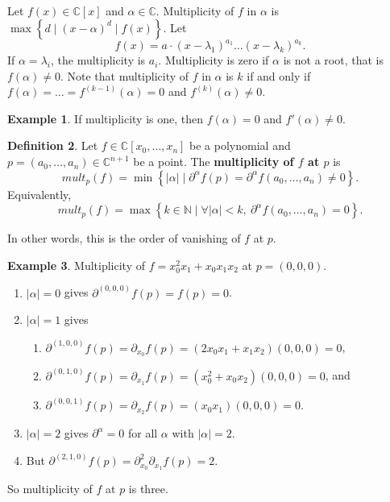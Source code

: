 \documentclass{article}
\newcommand{\N}{\mathbb{N}}
\newcommand{\C}{\mathbb{C}}
\newcommand{\rb}[1]{\left( #1 \right)}
\renewcommand{\sb}[1]{\left[ #1 \right]}
\newcommand{\cb}[1]{\left\{ #1 \right\}}
\newcommand{\abs}[1]{\left\lvert #1 \right\rvert}
\theoremstyle{definition}\newtheorem{definition}{Definition}[section]
\theoremstyle{definition}\newtheorem{notation}[definition]{Notation}
\theoremstyle{definition}\newtheorem{remark}[definition]{Remark}
\theoremstyle{definition}\newtheorem{example}[definition]{Example}
\theoremstyle{definition}\newtheorem{fact}{Fact}
\theoremstyle{definition}\newtheorem{exercise}{Exercise}
\begin{document}
Let $ f\rb{x} \in \C\sb{x} $ and $ \alpha \in \C $. Multiplicity of $ f $ in $ \alpha $ is $ \max\cb{d \mid \rb{x - \alpha}^d \mid f\rb{x}} $. Let
$$ f\rb{x} = a \cdot \rb{x - \lambda_1}^{a_1} \dots \rb{x - \lambda_k}^{a_k}. $$
If $ \alpha = \lambda_i $, the multiplicity is $ a_i $. Multiplicity is zero if $ \alpha $ is not a root, that is $ f\rb{\alpha} \ne 0 $. Note that multiplicity of $ f $ in $ \alpha $ is $ k $ if and only if $ f\rb{\alpha} = \dots = f^{\rb{k - 1}}\rb{\alpha} = 0 $ and $ f^{\rb{k}}\rb{\alpha} \ne 0 $.

\begin{example}
If multiplicity is one, then $ f\rb{\alpha} = 0 $ and $ f'\rb{\alpha} \ne 0 $.
\end{example}

\begin{definition}
Let $ f \in \C\sb{x_0, \dots, x_n} $ be a polynomial and $ p = \rb{a_0, \dots, a_n} \in \C^{n + 1} $ be a point. The \textbf{multiplicity of $ f $ at $ p $} is
$$ mult_p\rb{f} = \min\cb{\abs{\alpha} \mid \partial^\alpha f\rb{p} = \partial^\alpha f\rb{a_0, \dots, a_n} \ne 0}. $$
Equivalently,
$$ mult_p\rb{f} = \max\cb{k \in \N \mid \forall \abs{\alpha} < k, \ \partial^\alpha f\rb{a_0, \dots, a_n} = 0}. $$
\end{definition}


In other words, this is the order of vanishing of $ f $ at $ p $.

\begin{example}
Multiplicity of $ f = x_0^2x_1 + x_0x_1x_2 $ at $ p = \rb{0, 0, 0} $.
\begin{enumerate}
\item $ \abs{\alpha} = 0 $ gives $ \partial^{\rb{0, 0, 0}} f\rb{p} = f\rb{p} = 0 $.
\item $ \abs{\alpha} = 1 $ gives
\begin{enumerate}
\item $ \partial^{\rb{1, 0, 0}} f\rb{p} = \partial_{x_0} f\rb{p} = \rb{2x_0x_1 + x_1x_2}\rb{0, 0, 0} = 0 $,
\item $ \partial^{\rb{0, 1, 0}} f\rb{p} = \partial_{x_1} f\rb{p} = \rb{x_0^2 + x_0x_2}\rb{0, 0, 0} = 0 $, and
\item $ \partial^{\rb{0, 0, 1}} f\rb{p} = \partial_{x_2} f\rb{p} = \rb{x_0x_1}\rb{0, 0, 0} = 0 $.
\end{enumerate}
\item $ \abs{\alpha} = 2 $ gives $ \partial^\alpha = 0 $ for all $ \alpha $ with $ \abs{\alpha} = 2 $.
\item But $ \partial^{\rb{2, 1, 0}} f\rb{p} = \partial_{x_0}^2 \partial_{x_1} f\rb{p} = 2 $.
\end{enumerate}
So multiplicity of $ f $ at $ p $ is three.
\end{example}
\end{document}
